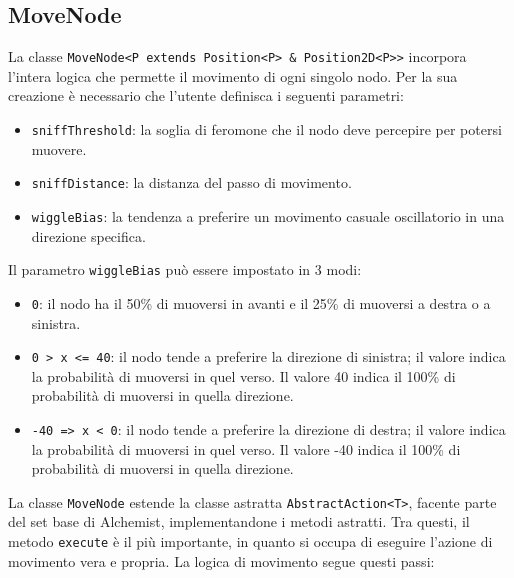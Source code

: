 \subsection{MoveNode}\label{moveNode}
La classe \texttt{MoveNode<P extends Position<P> \& Position2D<P>>} incorpora l'intera logica che permette il movimento di ogni singolo nodo. 
Per la sua creazione è necessario che l'utente definisca i seguenti parametri:
\begin{itemize}
    \item \texttt{sniffThreshold}: la soglia di feromone che il nodo deve percepire per potersi muovere.
    \item \texttt{sniffDistance}: la distanza del passo di movimento.
    \item \texttt{wiggleBias}: la tendenza a preferire un movimento casuale oscillatorio in una direzione specifica.
\end{itemize}
Il parametro \texttt{wiggleBias} può essere impostato in 3 modi:
\begin{itemize}
    \item \texttt{0}: il nodo ha il 50\% di muoversi in avanti e il 25\% di muoversi a destra o a sinistra.
    \item \texttt{0 > x <= 40}: il nodo tende a preferire la direzione di sinistra; il valore indica la probabilità di muoversi in quel verso.
    Il valore 40 indica il 100\% di probabilità di muoversi in quella direzione.
    \item \texttt{-40 => x < 0}: il nodo tende a preferire la direzione di destra; il valore indica la probabilità di muoversi in quel verso.
    Il valore -40 indica il 100\% di probabilità di muoversi in quella direzione.
\end{itemize}
La classe \texttt{MoveNode} estende la classe astratta \texttt{AbstractAction<T>}, facente parte del set base di Alchemist, implementandone i metodi astratti.
Tra questi, il metodo \texttt{execute} è il più importante, in quanto si occupa di eseguire l'azione di movimento vera e propria.
La logica di movimento segue questi passi:
